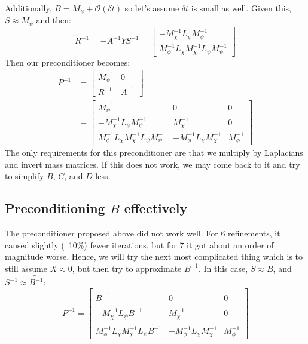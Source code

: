 \documentclass[reqno]{article}
\begin{document}
Additionally, $B = M_\psi + \mathcal{O}(\delta t)$ so let's assume $\delta t$ is small as well.
Given this, $S \approx M_\psi$ and then:
\begin{equation}
    R^{-1}
    =
    -A^{-1} Y S^{-1}
    =
    \begin{bmatrix}
        -M_\chi^{-1} L_\psi M_\psi^{-1} \\
        M_\phi^{-1} L_\chi M_\chi^{-1} L_\psi M_\psi^{-1}
    \end{bmatrix}
\end{equation}
Then our preconditioner becomes:
\begin{equation}
    \begin{split}
        P^{-1}
        &=
        \begin{bmatrix}
            M_\psi^{-1} &0 \\
            R^{-1} &A^{-1}
        \end{bmatrix} \\
        &=
        \begin{bmatrix}
            M_\psi^{-1} &0 &0\\
            -M_\chi^{-1} L_\psi M_\psi^{-1} &M_\chi^{-1} &0 \\
            M_\phi^{-1} L_\chi M_\chi^{-1} L_\psi M_\psi^{-1} &-M_\phi^{-1} L_\chi M_\chi^{-1} &M_\phi^{-1}
        \end{bmatrix}
    \end{split}
\end{equation}
The only requirements for this preconditioner are that we multiply by Laplacians and invert mass matrices.
If this does not work, we may come back to it and try to simplify $B$, $C$, and $D$ less.

\subsection{Preconditioning $B$ effectively}
The preconditioner proposed above did not work well.
For 6 refinements, it caused slightly (~10\%) fewer iterations, but for 7 it got about an order of magnitude worse.
Hence, we will try the next most complicated thing which is to still assume $X \approx 0$, but then try to approximate $B^{-1}$.
In this case, $S \approx B$, and $S^{-1} \approx \widetilde{B^{-1}}$:
\begin{equation}
    P^{-1}
    =
    \begin{bmatrix}
        \widetilde{B^{-1}} &0 &0\\
        -M_\chi^{-1} L_\psi \widetilde{B^{-1}} &M_\chi^{-1} &0 \\
        M_\phi^{-1} L_\chi M_\chi^{-1} L_\psi \widetilde{B^{-1}} &-M_\phi^{-1} L_\chi M_\chi^{-1} &M_\phi^{-1}
    \end{bmatrix}
\end{equation}
\end{document}
